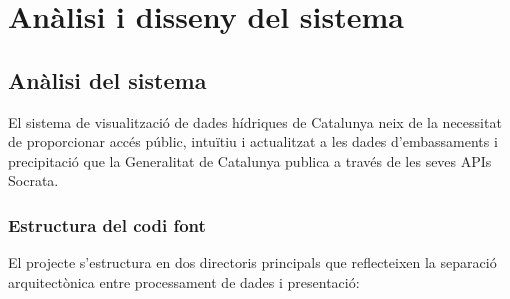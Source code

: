 

\chapter{Anàlisi i disseny del sistema}
\label{Ch:AnalysisDesign}


\section{Anàlisi del sistema}

El sistema de visualització de dades hídriques de Catalunya neix de la necessitat de proporcionar accés públic, intuïtiu i actualitzat a les dades d'embassaments i precipitació que la Generalitat de Catalunya publica a través de les seves APIs Socrata.

\subsection{Estructura del codi font}

El projecte s'estructura en dos directoris principals que reflecteixen la separació arquitectònica entre processament de dades i presentació:

